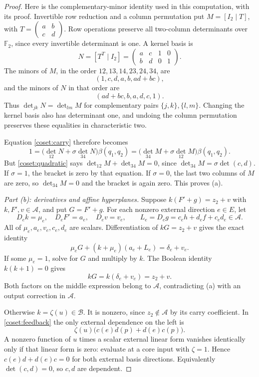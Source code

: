 \documentclass[11pt,a4paper]{article}
\theoremstyle{plain}
\theoremstyle{remark}
\newcommand{\F}{\mathbb F_2}
\begin{document}
\begin{proof}
Here is the complementary-minor identity used in this computation, with its proof. Invertible row reduction and a column permutation put $M=[I_2\mid T]$, with $T=\left(\begin{smallmatrix}a&b\\c&d\end{smallmatrix}\right)$. Row operations preserve all two-column determinants over $\F$, since every invertible determinant is one. A kernel basis is
\[
N=[T^T\mid I_2]=\begin{pmatrix}a&c&1&0\\b&d&0&1\end{pmatrix}.
\]
The minors of $M$, in the order $12,13,14,23,24,34$, are
\[
(1,c,d,a,b,ad+bc),
\]
and the minors of $N$ in that order are
\[
(ad+bc,b,a,d,c,1).
\]
Thus $\det_{jk}N=\det_{lm}M$ for complementary pairs $\{j,k\},\{l,m\}$. Changing the kernel basis also has determinant one, and undoing the column permutation preserves these equalities in characteristic two.

Equation \eqref{coset:carry} therefore becomes
\[
1=\bigl(\det_{12}N+\sigma\det_{34}N\bigr)\beta(q_1,q_2)
 =\bigl(\det_{34}M+\sigma\det_{12}M\bigr)\beta(q_1,q_2).
\]
But \eqref{coset:quadratic} says $\det_{12}M+\det_{34}M=0$, since $\det_{34}M=\sigma\det(c,d)$. If $\sigma=1$, the bracket is zero by that equation. If $\sigma=0$, the last two columns of $M$ are zero, so $\det_{34}M=0$ and the bracket is again zero. This proves (a).

\emph{Part (b): derivatives and affine hyperplanes.} Suppose $k(F'+g)=z_2+v$ with $k,F',v\in\mathcal A$, and put $G=F'+g$. For each nonzero external direction $e\in E$, let
\[
D_ek=\mu_e,\quad D_eF'=a_e,\quad D_ev=v_e,\qquad
L_e=D_eg=c_eh+d_ef+c_ed_e\in\mathcal A.
\]
All of $\mu_e,a_e,v_e,c_e,d_e$ are scalars. Differentiation of $kG=z_2+v$ gives the exact identity
\begin{equation}\label{coset:feedback}
\mu_eG+(k+\mu_e)(a_e+L_e)=\delta_e+v_e.
\end{equation}
If some $\mu_e=1$, solve for $G$ and multiply by $k$. The Boolean identity $k(k+1)=0$ gives
\[
kG=k(\delta_e+v_e)=z_2+v.
\]
Both factors on the middle expression belong to $\mathcal A$, contradicting (a) with an output correction in $\mathcal A$.

Otherwise $k=\zeta(u)\in\mathcal B$. It is nonzero, since $z_2\notin\mathcal A$ by its carry coefficient. In \eqref{coset:feedback} the only external dependence on the left is
\[
\zeta(u)\bigl(c(e)d(p)+d(e)c(p)\bigr).
\]
A nonzero function of $u$ times a scalar external linear form vanishes identically only if that linear form is zero: evaluate at a core input with $\zeta=1$. Hence $c(e)d+d(e)c=0$ for both external basis directions. Equivalently $\det(c,d)=0$, so $c,d$ are dependent.


\end{proof}
\end{document}
